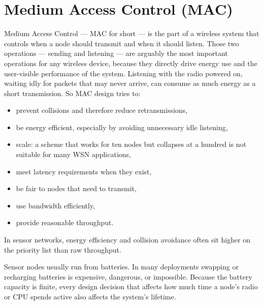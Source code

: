 \section{Medium Access Control (MAC)}
Medium Access Control — MAC for short — is the part of a wireless system that controls when a node should transmit and when it should listen. Those two operations — sending and listening — are arguably the most important operations for any wireless device, because they directly drive energy use and the user-visible performance of the system. Listening with the radio powered on, waiting idly for packets that may never arrive, can consume as much energy as a short transmission. So MAC design tries to:
\begin{itemize}
    \item prevent collisions and therefore reduce retransmissions,
    \item be energy efficient, especially by avoiding unnecessary idle listening,
    \item scale: a scheme that works for ten nodes but collapses at a hundred is not suitable for many WSN applications,
    \item meet latency requirements when they exist, 
    \item be fair to nodes that need to transmit, 
    \item use bandwidth efficiently,
    \item provide reasonable throughput.
\end{itemize}
In sensor networks, energy efficiency and collision avoidance often sit higher on the priority list than raw throughput.

Sensor nodes usually run from batteries. In many deployments swapping or recharging batteries is expensive, dangerous, or impossible. Because the battery capacity is finite, every design decision that affects how much time a node’s radio or CPU spends active also affects the system’s lifetime.

